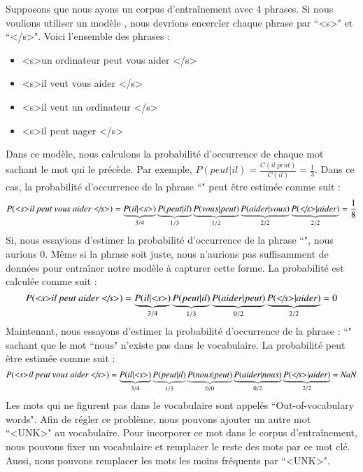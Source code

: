 \documentclass{KodeBook}
\begin{document}
Supposons que nous ayons un corpus d'entraînement avec 4 phrases. 
Si nous voulions utiliser un modèle , nous devrions encercler chaque phrase par ``\textless s\textgreater" et ``\textless/s\textgreater".
Voici l'ensemble des phrases :
\begin{itemize}
	\item \textless s\textgreater un ordinateur peut vous aider \textless/s\textgreater
	\item \textless s\textgreater il veut vous aider \textless/s\textgreater
	\item \textless s\textgreater il veut un ordinateur \textless/s\textgreater
	\item \textless s\textgreater il peut nager \textless/s\textgreater
\end{itemize}
%
Dans ce modèle, nous calculons la probabilité d'occurrence de chaque mot sachant le mot qui le précède. 
Par exemple, $P(peut | il) = \frac{C(il\ peut)}{C(il)} = \frac{1}{3}$.
Dans ce cas, la probabilité d'occurrence de la phrase ``" peut être estimée comme suit :
\[
P(\text{\textit{\textless s\textgreater il peut vous aider \textless/s\textgreater}}) = 
\underbrace{P(il|\text{\textit{\textless s\textgreater}})}_{3/4}
\underbrace{P(peut|il)}_{1/3} 
\underbrace{P(vous|peut)}_{1/2} 
\underbrace{P(aider|vous)}_{2/2}
\underbrace{P(\text{\textit{\textless/s\textgreater}}|aider)}_{2/2} = 
\frac{1}{8}
\]
%
Si, nous essayions d'estimer la probabilité d'occurrence de la phrase ``", nous aurions $0$. 
Même si la phrase soit juste, nous n'aurions pas suffisamment de données pour entraîner notre modèle à capturer cette forme. 
La probabilité est calculée comme suit : 
\[
P(\text{\textit{\textless s\textgreater il peut aider \textless/s\textgreater}}) = 
\underbrace{P(il|\text{\textit{\textless s\textgreater}})}_{3/4}
\underbrace{P(peut|il)}_{1/3} 
\underbrace{P(aider|peut)}_{0/2}
\underbrace{P(\text{\textit{\textless/s\textgreater}}|aider)}_{2/2} = 
0
\]
%
Maintenant, nous essayons d'estimer la probabilité d'occurrence de la phrase : 
``" sachant que le mot ``nous" n'existe pas dans le vocabulaire. 
La probabilité peut être estimée comme suit : 
\[
P(\text{\textit{\textless s\textgreater il peut vous aider \textless/s\textgreater}}) = 
\underbrace{P(il|\text{\textit{\textless s\textgreater}})}_{3/4}
\underbrace{P(peut|il)}_{1/3} 
\underbrace{P(nous|peut)}_{0/0} 
\underbrace{P(aider|nous)}_{0/2}
\underbrace{P(\text{\textit{\textless/s\textgreater}}|aider)}_{2/2} = 
\text{\textit{NaN}}
\]
Les mots qui ne figurent pas dans le vocabulaire sont appelés ``Out-of-vocabulary words". 
Afin de régler ce problème, nous pouvons ajouter un autre mot ``\textless UNK\textgreater" au vocabulaire. 
Pour incorporer ce mot dans le corpus d'entraînement, nous pouvons fixer un vocabulaire et remplacer le reste des mots par ce mot clé.
Aussi, nous pouvons remplacer les mots les moins fréquents par ``\textless UNK\textgreater". 
\end{document}
